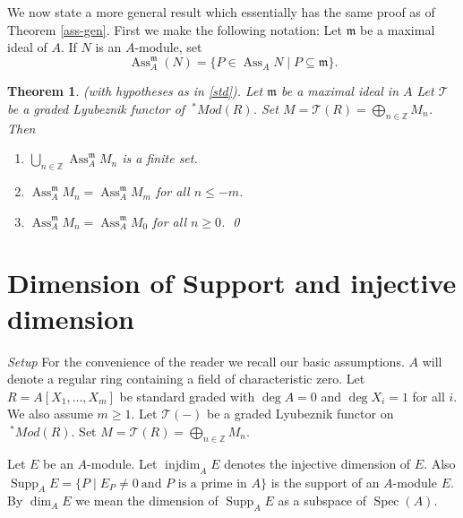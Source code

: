 \documentclass{amsart}
\newcommand{\ZZ}{\mathbb{Z} }
\newcommand{\m}{\mathfrak{m} }
\newcommand{\FF}{\mathcal{T}}
\newcommand{\Supp}{\operatorname{Supp}}
\newcommand{\injdim}{\operatorname{injdim}}
\newcommand{\Spec}{\operatorname{Spec}}
\newcommand{\Ass}{\operatorname{Ass}}
\theoremstyle{plain}
\newtheorem{theorem}{Theorem}[section]
\theoremstyle{definition}
\theoremstyle{remark}
\begin{document}
 We now state a more general result which  essentially has the same proof as of Theorem \ref{ass-gen}. First we make the following notation: Let $\m$ be a maximal ideal of $A$. If $N$ is an $A$-module, set
 \[
 \Ass_A^\m(N) = \{ P \in \Ass_A N \mid P \subseteq \m \}.
 \]
 \begin{theorem} \label{ass-gen2}
 (with hypotheses as in \ref{std}). 
Let $\m$ be a maximal ideal in $A$  
  Let  $\FF$ be a graded Lyubeznik functor of $ \ ^* Mod(R)$. Set $M = \FF(R) = \bigoplus_{n \in \ZZ}M_n$. Then
\begin{enumerate}[\rm (1)]
\item
$\bigcup_{n \in \ZZ} \Ass_A^\m M_n   $ is a finite set.
\item
$\Ass_A^\m M_n = \Ass_A^\m M_m$ for all $n \leq -m$.
\item
$\Ass_A^\m M_n = \Ass_A^\m M_0$ for all $n \geq 0$. \qed
\end{enumerate}
 \end{theorem}
\section{Dimension of Support and injective dimension}
\s \label{set-final} \emph{Setup} For the convenience of the reader we recall our basic assumptions. $A$ will denote a regular ring containing a field of characteristic zero. Let $R = A[X_1,\ldots, X_m]$ be standard graded with $\deg A = 0$ and $\deg X_i = 1$ for all $i$. We also assume $m \geq 1$. Let $\FF(-)$ be a graded Lyubeznik functor on $ \ ^* Mod(R)$.  Set $M =  \FF(R) = \bigoplus_{n \in \ZZ}M_n$.

Let $E$ be an $A$-module. Let
$\injdim_A E$ denotes the injective dimension of $E$. Also 
$\Supp_A E = \{ P \mid  E_P \neq 0 \ \text{and $P$ is a prime in $A$}\}$ is the support of an $A$-module $E$. 
By $\dim_A E $ we mean the dimension of $\Supp_A E$ as a subspace of $\Spec(A)$.
\end{document}
